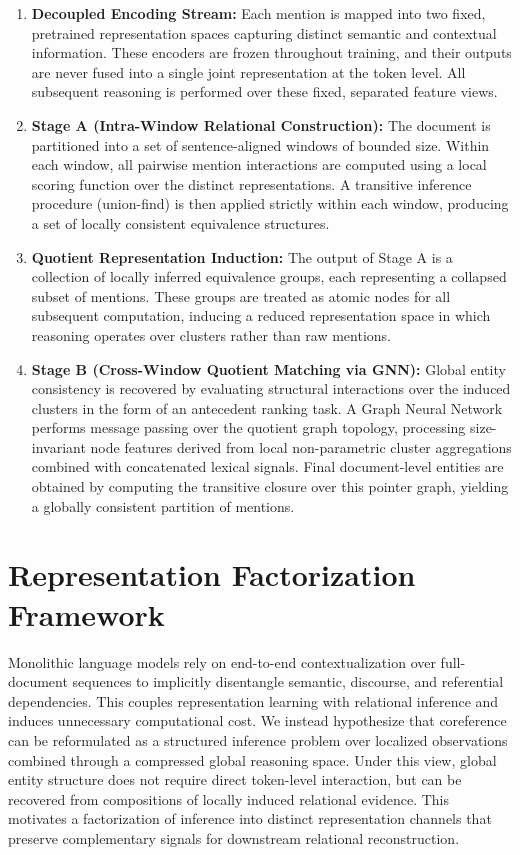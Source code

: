 \documentclass[12pt]{article}
\begin{document}
	\begin{enumerate}
		\item \textbf{Decoupled Encoding Stream:} Each mention is mapped into two fixed, pretrained representation spaces capturing distinct semantic and contextual information. These encoders are frozen throughout training, and their outputs are never fused into a single joint representation at the token level. All subsequent reasoning is performed over these fixed, separated feature views.
		
		\item \textbf{Stage A (Intra-Window Relational Construction):} The document is partitioned into a set of sentence-aligned windows of bounded size. Within each window, all pairwise mention interactions are computed using a local scoring function over the distinct representations. A transitive inference procedure (union-find) is then applied strictly within each window, producing a set of locally consistent equivalence structures.
		
		\item \textbf{Quotient Representation Induction:} The output of Stage A is a collection of locally inferred equivalence groups, each representing a collapsed subset of mentions. These groups are treated as atomic nodes for all subsequent computation, inducing a reduced representation space in which reasoning operates over clusters rather than raw mentions.
		
		\item \textbf{Stage B (Cross-Window Quotient Matching via GNN):} Global entity consistency is recovered by evaluating structural interactions over the induced clusters in the form of an antecedent ranking task. A Graph Neural Network performs message passing over the quotient graph topology, processing size-invariant node features derived from local non-parametric cluster aggregations combined with concatenated lexical signals. Final document-level entities are obtained by computing the transitive closure over this pointer graph, yielding a globally consistent partition of mentions.
	\end{enumerate}
	
	\section{Representation Factorization Framework}\label{sec:factorization}
	Monolithic language models rely on end-to-end contextualization over full-document sequences to implicitly disentangle semantic, discourse, and referential dependencies. This couples representation learning with relational inference and induces unnecessary computational cost. We instead hypothesize that coreference can be reformulated as a structured inference problem over localized observations combined through a compressed global reasoning space. Under this view, global entity structure does not require direct token-level interaction, but can be recovered from compositions of locally induced relational evidence. This motivates a factorization of inference into distinct representation channels that preserve complementary signals for downstream relational reconstruction.
	
\end{document}
